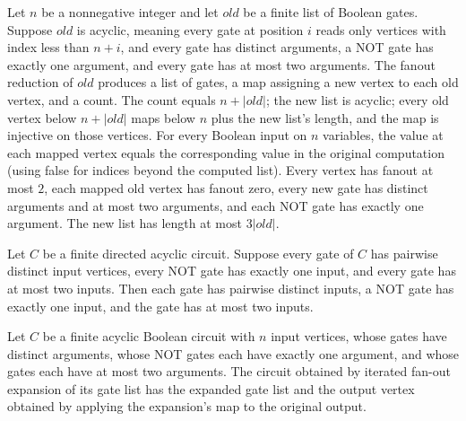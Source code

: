 \begin{theorem}
\label{BoolCircuit.foGates_inv}
\leanok
{}
Let $n$ be a nonnegative integer and let $old$ be a finite list of Boolean gates.
Suppose $old$ is acyclic, meaning every gate at position $i$ reads only vertices with
index less than $n+i$, and every gate has distinct arguments, a NOT gate has exactly one
argument, and every gate has at most two arguments. The fanout reduction of $old$
produces a list of gates, a map assigning a new vertex to each old vertex, and a count.
The count equals $n+|old|$; the new list is acyclic; every old vertex below $n+|old|$
maps below $n$ plus the new list’s length, and the map is injective on those vertices.
For every Boolean input on $n$ variables, the value at each mapped vertex equals the
corresponding value in the original computation (using false for indices beyond the
computed list). Every vertex has fanout at most $2$, each mapped old vertex has fanout
zero, every new gate has distinct arguments and at most two arguments, and each NOT gate
has exactly one argument. The new list has length at most $3|old|$.
\end{theorem}

\begin{theorem}
\label{BoolCircuit.gates_ok_of_isFaninTwo}
\leanok
{}
Let $C$ be a finite directed acyclic circuit. Suppose every gate of $C$ has pairwise
distinct input vertices, every NOT gate has exactly one input, and every gate has at
most two inputs. Then each gate has pairwise distinct inputs, a NOT gate has exactly one
input, and the gate has at most two inputs.
\end{theorem}

\begin{definition}
\label{BoolCircuit.DAGCircuit.fanoutTwo}
\leanok
{}
Let $C$ be a finite acyclic Boolean circuit with $n$ input vertices, whose gates have
distinct arguments, whose NOT gates each have exactly one argument, and whose gates each
have at most two arguments. The circuit obtained by iterated fan-out expansion of its
gate list has the expanded gate list and the output vertex obtained by applying the
expansion's map to the original output.
\end{definition}

